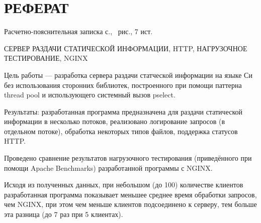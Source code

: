 \section*{\large РЕФЕРАТ}

Расчетно-пояснительная записка \pageref{LastPage} с., \totalfigures\ рис., 7 ист.

СЕРВЕР РАЗДАЧИ СТАТИЧЕСКОЙ ИНФОРМАЦИИ, HTTP, НАГРУЗОЧНОЕ ТЕСТИРОВАНИЕ, NGINX


Цель работы ---  разработка сервера раздачи статческой информации на языке Си без использования сторонних библиотек, построенного при помощи паттерна thread pool и использующего системный вызов pselect.

Результаты: разработанная программа предназначена для раздачи статической информации в несколько потоков, реализовано логирование запросов (в отдельном потоке), обработка некоторых типов файлов, поддержка статусов HTTP.

Проведено сравнение результатов нагрузочного тестирования (приведённого при помощи Apache Benchmarks) разработанной программы с NGINX.

Исходя из полученных данных, при небольшом (до 100) количестве клиентов разработанная программа показывает меньшее среднее время обработки запросов, чем NGINX, при этом чем меньше клиентов подсоединено к серверу, тем больше эта разница (до 7 раз при 5 клиентах).


\pagebreak